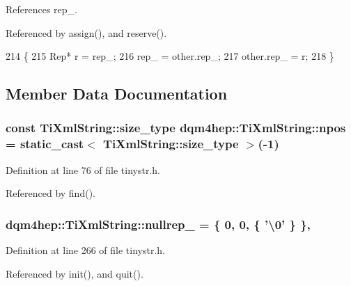 References rep\+\_\+.



Referenced by assign(), and reserve().


\begin{DoxyCode}
214   \{
215     Rep* r = rep_;
216     rep_ = other.rep\_;
217     other.rep\_ = r;
218   \}
\end{DoxyCode}


\subsection{Member Data Documentation}
\subsubsection[{npos}]{\setlength{\rightskip}{0pt plus 5cm}const {\bf Ti\+Xml\+String\+::size\+\_\+type} dqm4hep\+::\+Ti\+Xml\+String\+::npos = static\+\_\+cast$<$ {\bf Ti\+Xml\+String\+::size\+\_\+type} $>$(-\/1)\hspace{0.3cm}{\ttfamily [static]}}\label{classdqm4hep_1_1TiXmlString_a04a1a9bb29f11e8f1502fcfa60803b00}


Definition at line 76 of file tinystr.\+h.



Referenced by find().

\subsubsection[{nullrep\+\_\+}]{ dqm4hep\+::\+Ti\+Xml\+String\+::nullrep\+\_\+ = \{ 0, 0, \{ '\textbackslash{}0' \} \}\hspace{0.3cm}{\ttfamily [static]}, {\ttfamily [private]}}\label{classdqm4hep_1_1TiXmlString_a3dd24e238f188e64534c0183a66d9806}


Definition at line 266 of file tinystr.\+h.



Referenced by init(), and quit().

